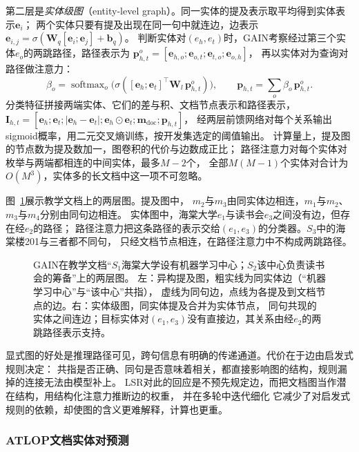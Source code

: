 第二层是\emph{实体级图}（entity-level graph）。同一实体的提及表示取平均得到实体表示$\bm{e}_i$；
两个实体只要有提及出现在同一句中就连边，边表示
$\bm{e}_{i,j}=\sigma(\bm{W}_q[\bm{e}_i;\bm{e}_j]+\bm{b}_q)$。
判断实体对$(e_h,e_t)$时，GAIN考察经过第三个实体$e_o$的两跳路径，路径表示为
$\bm{p}^{o}_{h,t}=[\bm{e}_{h,o};\bm{e}_{o,t};\bm{e}_{t,o};\bm{e}_{o,h}]$，
再以实体对为查询对路径做注意力：
\[
  \beta_o=\operatorname{softmax}_o\bigl(\sigma([\bm{e}_h;\bm{e}_t]^{\top}\bm{W}_l\,\bm{p}^{o}_{h,t})\bigr),
  \qquad
  \bm{p}_{h,t}=\sum_{o}\beta_o\,\bm{p}^{o}_{h,t}.
\]
分类特征拼接两端实体、它们的差与积、文档节点表示和路径表示，
$\bm{I}_{h,t}=[\bm{e}_h;\bm{e}_t;|\bm{e}_h-\bm{e}_t|;\bm{e}_h\odot\bm{e}_t;\bm{m}_{\mathrm{doc}};\bm{p}_{h,t}]$，
经两层前馈网络对每个关系输出sigmoid概率，用二元交叉熵训练，按开发集选定的阈值输出。
计算量上，提及图的节点数为提及数加一，图卷积的代价与边数成正比；
路径注意力对每个实体对枚举与两端都相连的中间实体，最多$M-2$个，
全部$M(M-1)$个实体对合计为$O(M^3)$，实体多的长文档中这一项不可忽略。

图~\ref{fig:nlp-extraction-gain}展示教学文档上的两层图。提及图中，
$m_2$与$m_3$由同实体边相连，$m_1$与$m_2$、$m_3$与$m_4$分别由同句边相连。
实体图中，海棠大学$e_1$与读书会$e_3$之间没有边，但存在经$e_2$的路径；
路径注意力把这条路径的表示交给$(e_1,e_3)$的分类器。$S_3$中的海棠楼201与三者都不同句，
只经文档节点相连，在路径注意力中不构成两跳路径。

\begin{figure}[htbp]
  \centering
  
  \caption{GAIN在教学文档“$S_1$海棠大学设有机器学习中心；$S_2$该中心负责读书会的筹备”上的两层图。
  左：异构提及图，粗实线为同实体边（“机器学习中心”与“该中心”共指），
  虚线为同句边，点线为各提及到文档节点的边。右：实体级图，同实体提及合并为实体节点，
  同句共现的实体之间连边；目标实体对$(e_1,e_3)$没有直接边，其关系由经$e_2$的两跳路径表示支持。}
  \label{fig:nlp-extraction-gain}
\end{figure}

显式图的好处是推理路径可见，跨句信息有明确的传递通道。代价在于边由启发式规则决定：
共指是否正确、同句是否意味着相关，都直接影响图的结构，规则漏掉的连接无法由模型补上。
LSR对此的回应是不预先规定边，而把文档图当作潜在结构，用结构化注意力推断边的权重，
并在多轮中迭代细化
它减少了对启发式规则的依赖，却使图的含义更难解释，计算也更重。

\subsubsection{ATLOP文档实体对预测}
\label{sec:nlp-extraction-atlop}

